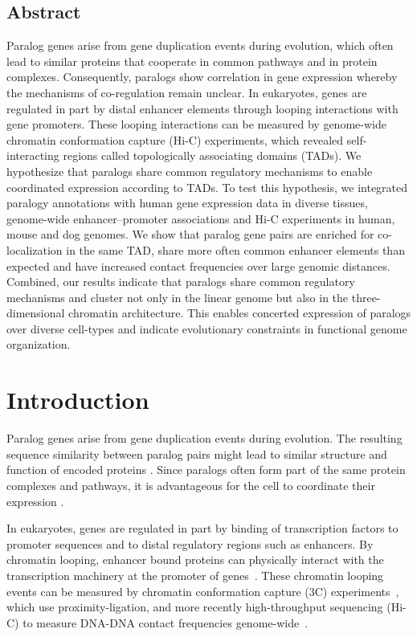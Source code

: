 \documentclass[a4paper,twoside=true,openright,parskip=full,chapterprefix=true,11pt,headings=normal,bibliography=totoc,listof=totoc,titlepage=on,captions=tableabove,draft=false]{scrreprt}
\theoremstyle{definition}
\theoremstyle{definition}
\theoremstyle{definition}
\theoremstyle{remark}
\begin{document}
\hypertarget{abstract-1}{%
\subsection*{Abstract}\label{abstract-1}}

Paralog genes arise from gene duplication events during evolution, which
often lead to similar proteins that cooperate in common pathways and in
protein complexes. Consequently, paralogs show correlation in gene
expression whereby the mechanisms of co-regulation remain unclear. In
eukaryotes, genes are regulated in part by distal enhancer elements
through looping interactions with gene promoters. These looping
interactions can be measured by genome-wide chromatin conformation
capture (Hi-C) experiments, which revealed self-interacting regions
called topologically associating domains (TADs). We hypothesize that
paralogs share common regulatory mechanisms to enable coordinated
expression according to TADs. To test this hypothesis, we integrated
paralogy annotations with human gene expression data in diverse tissues,
genome-wide enhancer--promoter associations and Hi-C experiments in
human, mouse and dog genomes. We show that paralog gene pairs are
enriched for co-localization in the same TAD, share more often common
enhancer elements than expected and have increased contact frequencies
over large genomic distances. Combined, our results indicate that
paralogs share common regulatory mechanisms and cluster not only in the
linear genome but also in the three-dimensional chromatin architecture.
This enables concerted expression of paralogs over diverse cell-types
and indicate evolutionary constraints in functional genome organization.

\hypertarget{introduction}{%
\section{Introduction}\label{introduction}}

Paralog genes arise from gene duplication events during evolution. The
resulting sequence similarity between paralog pairs might lead to
similar structure and function of encoded proteins \citep{Koonin2005}.
Since paralogs often form part of the same protein complexes and
pathways, it is advantageous for the cell to coordinate their expression
\citep{Makova2003}.

In eukaryotes, genes are regulated in part by binding of transcription
factors to promoter sequences and to distal regulatory regions such as
enhancers. By chromatin looping, enhancer bound proteins can physically
interact with the transcription machinery at the promoter of
genes~\citep{Ptashne1986, Deng2012, Carter2002, Tolhuis2002, Spitz2012}.
These chromatin looping events can be measured by chromatin conformation
capture (3C) experiments~\citep{Dekker2002}, which use
proximity-ligation, and more recently high-throughput sequencing (Hi-C)
to measure DNA-DNA contact frequencies
genome-wide~\citep{Lieberman-Aiden2009}.
\end{document}
